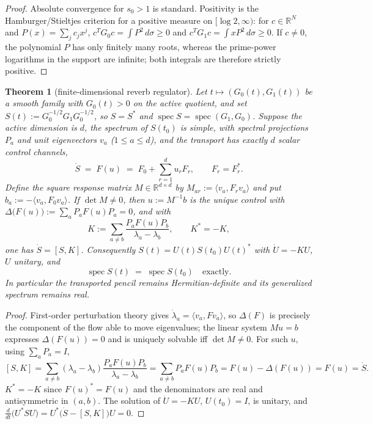 \documentclass[11pt]{article}
\theoremstyle{plain}
\newtheorem{theorem}{Theorem}
\theoremstyle{definition}
\theoremstyle{remark}
\newcommand{\R}{\mathbb{R}}
\DeclareMathOperator{\spec}{spec}
\begin{document}
\begin{proof}
Absolute convergence for $s_0>1$ is standard. Positivity is the Hamburger/Stieltjes
criterion for a positive measure on $[\log2,\infty)$: for $c\in\R^N$ and
$P(x)=\sum_j c_jx^j$, $c^{T}G_0c=\int P^2\,d\sigma\ge0$ and
$c^{T}G_1c=\int xP^2\,d\sigma\ge0$. If $c\ne0$, the polynomial $P$ has only finitely
many roots, whereas the prime-power logarithms in the support are infinite; both
integrals are therefore strictly positive.
\end{proof}

\begin{theorem}[finite-dimensional reverb regulator]\label{thm:regulator}
Let $t\mapsto (G_0(t),G_1(t))$ be a smooth family with $G_0(t)>0$ on the active quotient,
and set $S(t):=G_0^{-1/2}G_1G_0^{-1/2}$, so $S=S^{*}$ and
$\spec S=\spec(G_1,G_0)$. Suppose the active dimension is $d$, the spectrum of
$S(t_0)$ is simple, with spectral projections $P_a$ and unit eigenvectors $v_a$
($1\le a\le d$), and the transport has exactly $d$ scalar control channels,
\[
  \dot S \;=\; F(u) \;=\; F_0 + \sum_{r=1}^{d} u_r F_r ,
  \qquad F_r = F_r^{*}.
\]
Define the square response matrix $M\in\R^{d\times d}$ by
$M_{ar}:=\langle v_a,F_rv_a\rangle$ and put
$b_a:=-\langle v_a,F_0v_a\rangle$.
If $\det M \ne 0$, then $u := M^{-1}b$ is the unique control with
$\Delta\bigl(F(u)\bigr):=\sum_a P_aF(u)P_a = 0$, and with
\[
  K := \sum_{a\ne b}\frac{P_aF(u)P_b}{\lambda_a-\lambda_b},
  \qquad K^{*}=-K,
\]
one has $\dot S = [S,K]$. Consequently $S(t)=U(t)S(t_0)U(t)^{*}$ with $\dot U=-KU$,
$U$ unitary, and
\[
  \spec S(t) \;=\; \spec S(t_0)\quad\text{exactly.}
\]
In particular the transported pencil remains Hermitian-definite and its generalized
spectrum remains real.
\end{theorem}

\begin{proof}
First-order perturbation theory gives $\dot\lambda_a=\langle v_a,F v_a\rangle$, so
$\Delta(F)$ is precisely the component of the flow able to move eigenvalues; the linear
system $Mu=b$ expresses $\Delta(F(u))=0$ and is uniquely solvable iff $\det M\ne0$.
For such $u$, using $\sum_aP_a=I$,
\[
  [S,K]=\sum_{a\ne b}(\lambda_a-\lambda_b)\frac{P_aF(u)P_b}{\lambda_a-\lambda_b}
  =\sum_{a\ne b}P_aF(u)P_b=F(u)-\Delta(F(u))=F(u)=\dot S .
\]
$K^{*}=-K$ since $F(u)^{*}=F(u)$ and the denominators are real and antisymmetric in
$(a,b)$. The solution of $\dot U=-KU$, $U(t_0)=I$, is unitary, and
$\frac{d}{dt}\bigl(U^{*}SU\bigr)=U^{*}\bigl(\dot S-[S,K]\bigr)U=0$.
\end{proof}
\end{document}
